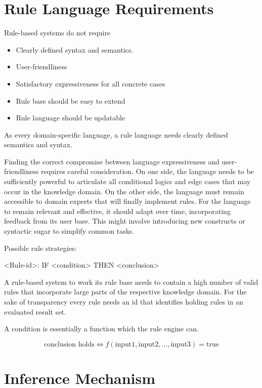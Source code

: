 \section{Rule Language Requirements}

Rule-based systems do not require


\begin{itemize}
    \item Clearly defined syntax and semantics.
    \item User-friendliness
    \item Satisfactory expressiveness for all concrete cases
    \item Rule base should be easy to extend
    \item Rule language should be updatable
\end{itemize}

As every domain-specific language, a rule language needs clearly defined semantics and syntax.


Finding the correct compromise between language expressiveness and user-friendliness\cite{https://doi.org/10.1002/widm.11} requires careful consideration.
On one side,
the language needs
to be sufficiently powerful to articulate all conditional logics and edge cases that may occur in the knowledge domain.
On the other side, the language must remain accessible to domain experts that will finally implement rules.
For the language to remain relevant and effective, it should adapt over time, incorporating feedback from its user base.
This might involve introducing new constructs or syntactic sugar to simplify common tasks.





Possible rule strategies:

<Rule-id>: IF <condition> THEN <conclusion>

A rule-based system to work its rule base needs
to contain a high number of valid rules that incorporate large parts of the respective knowledge domain.
For the sake of transparency every rule needs an id that identifies holding rules in an evaluated result set.

A condition is essentially a function which the rule engine can.

\[
    \text{conclusion holds} \Leftrightarrow f(\text{input1}, \text{input2}, \ldots, \text{input3}) = \text{true}
\]

\section{Inference Mechanism}

